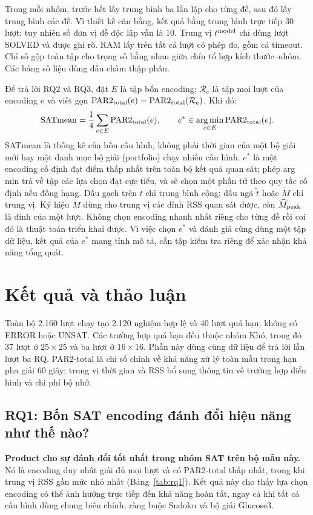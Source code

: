 \documentclass[a4paper]{cas-sc}
\newcommand{\PAR}{\operatorname{PAR2}_{\rm total}}
\begin{document}
Trong mỗi nhóm, trước hết lấy trung bình ba lần lặp cho từng đề, sau đó lấy trung bình các đề. Vì thiết kế cân bằng, kết quả bằng trung bình trực tiếp 30 lượt; tuy nhiên số đơn vị đề độc lập vẫn là 10. Trung vị $t^{\rm model}$ chỉ dùng lượt SOLVED và được ghi rõ. RAM lấy trên tất cả lượt có phép đo, gồm cả timeout. Chỉ số gộp toàn tập cho trọng số bằng nhau giữa chín tổ hợp kích thước--nhóm. Các bảng số liệu dùng dấu chấm thập phân.

Để trả lời RQ2 và RQ3, đặt $E$ là tập bốn encoding; $\mathcal R_e$ là tập mọi lượt của encoding $e$ và viết gọn $\PAR(e)=\PAR(\mathcal R_e)$. Khi đó:
\begin{equation}
\operatorname{SATmean}=\frac{1}{4}\sum_{e\in E}\PAR(e),\qquad
e^*\in\operatorname*{arg\,min}_{e\in E}\PAR(e).\label{eq:satmean}
\end{equation}
SATmean là thống kê của bốn cấu hình, không phải thời gian của một bộ giải mới hay một danh mục bộ giải (portfolio) chạy nhiều cấu hình. $e^*$ là một encoding cố định đạt điểm thấp nhất trên toàn bộ kết quả quan sát; phép arg min trả về tập các lựa chọn đạt cực tiểu, và sẽ chọn một phần tử theo quy tắc cố định nếu đồng hạng. Dấu gạch trên $\overline t$ chỉ trung bình cộng; dấu ngã $\widetilde t$ hoặc $\widetilde M$ chỉ trung vị. Ký hiệu $\widetilde M$ dùng cho trung vị các đỉnh RSS quan sát được, còn $\widehat M_{\rm peak}$ là đỉnh của một lượt. Không chọn encoding nhanh nhất riêng cho từng đề rồi coi đó là thuật toán triển khai được. Vì việc chọn $e^*$ và đánh giá cùng dùng một tập dữ liệu, kết quả của $e^*$ mang tính mô tả, cần tập kiểm tra riêng để xác nhận khả năng tổng quát.

\clearpage
\section{Kết quả và thảo luận}
Toàn bộ 2.160 lượt chạy tạo 2.120 nghiệm hợp lệ và 40 lượt quá hạn; không có ERROR hoặc UNSAT. Các trường hợp quá hạn đều thuộc nhóm Khó, trong đó 37 lượt ở $25\times25$ và ba lượt ở $16\times16$. Phần này dùng cùng dữ liệu để trả lời lần lượt ba RQ. PAR2-total là chỉ số chính về khả năng xử lý toàn mẫu trong hạn pha giải 60 giây; trung vị thời gian và RSS bổ sung thông tin về trường hợp điển hình và chi phí bộ nhớ.

\subsection{RQ1: Bốn SAT encoding đánh đổi hiệu năng như thế nào?}
\textbf{Product cho sự đánh đổi tốt nhất trong nhóm SAT trên bộ mẫu này.} Nó là encoding duy nhất giải đủ mọi lượt và có PAR2-total thấp nhất, trong khi trung vị RSS gần mức nhỏ nhất (Bảng~\ref{tab:rq1}). Kết quả này cho thấy lựa chọn encoding có thể ảnh hưởng trực tiếp đến khả năng hoàn tất, ngay cả khi tất cả cấu hình dùng chung biến chính, ràng buộc Sudoku và bộ giải Glucose3.
\end{document}
